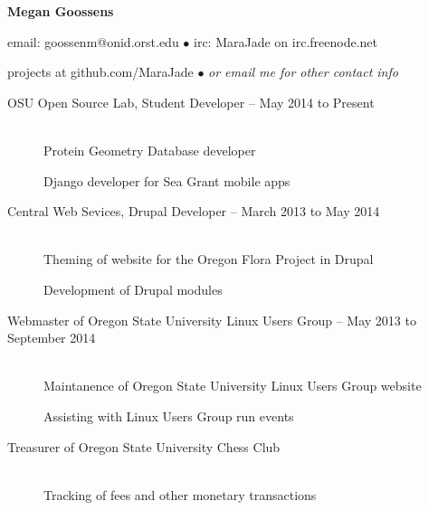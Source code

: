 \documentclass[11pt]{article}
\begin{document}
\centerline{{\LARGE \bf Megan Goossens}}

\bigskip

\centerline{email: goossenm@onid.orst.edu
        $\bullet$
        irc: MaraJade on irc.freenode.net}
\centerline{projects at github.com/MaraJade 
        $\bullet$
        \emph{or email me for other contact info}}

\bigskip
\hrulefill
\bigskip

\begin{description}
\item[OSU Open Source Lab, Student Developer -- May 2014 to Present]
    \hfill \\
    Protein Geometry Database developer

    Django developer for Sea Grant mobile apps
\end{description}


\begin{description}
\item[Central Web Sevices, Drupal Developer -- March 2013 to May 2014]
    \hfill \\
    Theming of website for the Oregon Flora Project in Drupal
    
    Development of Drupal modules
\end{description}

\smallskip
\hrulefill
\bigskip

\begin{description}
     \item[Webmaster of Oregon State University Linux Users Group -- May 2013 to September 2014]
        \hfill \\
        Maintanence of Oregon State University Linux Users Group website

        Assisting with Linux Users Group run events

   \item[Treasurer of Oregon State University Chess Club]
        \hfill \\ 
        Tracking of fees and other monetary transactions
\end{description}

\smallskip
\hrulefill
\bigskip
\end{document}
